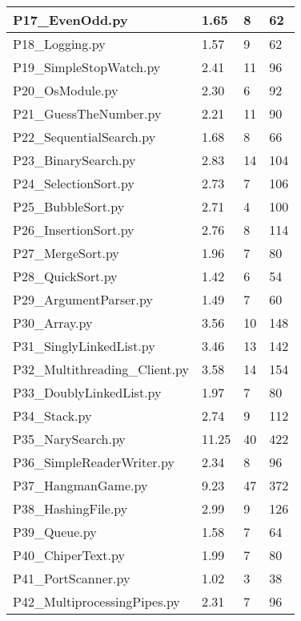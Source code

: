 \begin{longtable}{|p{5cm}|p{3.5cm}|p{1cm}|p{3cm}|}
        \hline
        P17\_EvenOdd.py& 1.65 & 8 &62\\
        \hline
        P18\_Logging.py& 1.57 & 9 & 62\\
        \hline
        P19\_SimpleStopWatch.py& 2.41 & 11 & 96\\
        \hline
        P20\_OsModule.py& 2.30 & 6 & 92\\
        \hline
        P21\_GuessTheNumber.py& 2.21 & 11 & 90\\
        \hline
        P22\_SequentialSearch.py& 1.68 & 8 & 66\\
        \hline
        P23\_BinarySearch.py& 2.83 & 14 & 104\\
        \hline
        P24\_SelectionSort.py& 2.73 & 7 & 106\\
        \hline
        P25\_BubbleSort.py& 2.71 & 4 & 100\\
        \hline
        P26\_InsertionSort.py& 2.76 & 8 & 114\\
        \hline
        P27\_MergeSort.py& 1.96 & 7 & 80\\
        \hline
        P28\_QuickSort.py& 1.42 & 6 & 54\\
        \hline
        P29\_ArgumentParser.py& 1.49 & 7 & 60\\
        \hline
        P30\_Array.py& 3.56 & 10 & 148\\
        \hline
        P31\_SinglyLinkedList.py& 3.46 & 13 & 142\\
        \hline
        P32\_Multithreading\_Client.py& 3.58 & 14 & 154\\
        \hline
        P33\_DoublyLinkedList.py& 1.97 & 7 & 80\\
        \hline
        P34\_Stack.py& 2.74 & 9 & 112\\
        \hline
        P35\_NarySearch.py& 11.25 & 40 & 422\\
        \hline
        P36\_SimpleReaderWriter.py& 2.34 & 8 & 96\\
        \hline
        P37\_HangmanGame.py&9.23 & 47& 372\\
        \hline
        P38\_HashingFile.py& 2.99 & 9 & 126\\
        \hline
        P39\_Queue.py&1.58& 7 & 64\\
        \hline
        P40\_ChiperText.py& 1.99 & 7 & 80\\
        \hline
        P41\_PortScanner.py& 1.02 & 3& 38\\
        \hline
        P42\_MultiprocessingPipes.py&2.31& 7& 96\\

\end{longtable}
